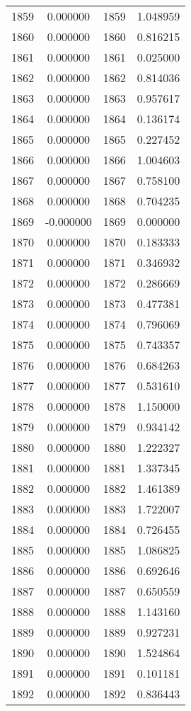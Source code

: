 \documentclass[12pt]{article}
\begin{document}
\begin{longtable}{@{}cccc@{}}
1859 & 0.000000 & 1859 & 1.048959 \\
1860 & 0.000000 & 1860 & 0.816215 \\
1861 & 0.000000 & 1861 & 0.025000 \\
1862 & 0.000000 & 1862 & 0.814036 \\
1863 & 0.000000 & 1863 & 0.957617 \\
1864 & 0.000000 & 1864 & 0.136174 \\
1865 & 0.000000 & 1865 & 0.227452 \\
1866 & 0.000000 & 1866 & 1.004603 \\
1867 & 0.000000 & 1867 & 0.758100 \\
1868 & 0.000000 & 1868 & 0.704235 \\
1869 & -0.000000 & 1869 & 0.000000 \\
1870 & 0.000000 & 1870 & 0.183333 \\
1871 & 0.000000 & 1871 & 0.346932 \\
1872 & 0.000000 & 1872 & 0.286669 \\
1873 & 0.000000 & 1873 & 0.477381 \\
1874 & 0.000000 & 1874 & 0.796069 \\
1875 & 0.000000 & 1875 & 0.743357 \\
1876 & 0.000000 & 1876 & 0.684263 \\
1877 & 0.000000 & 1877 & 0.531610 \\
1878 & 0.000000 & 1878 & 1.150000 \\
1879 & 0.000000 & 1879 & 0.934142 \\
1880 & 0.000000 & 1880 & 1.222327 \\
1881 & 0.000000 & 1881 & 1.337345 \\
1882 & 0.000000 & 1882 & 1.461389 \\
1883 & 0.000000 & 1883 & 1.722007 \\
1884 & 0.000000 & 1884 & 0.726455 \\
1885 & 0.000000 & 1885 & 1.086825 \\
1886 & 0.000000 & 1886 & 0.692646 \\
1887 & 0.000000 & 1887 & 0.650559 \\
1888 & 0.000000 & 1888 & 1.143160 \\
1889 & 0.000000 & 1889 & 0.927231 \\
1890 & 0.000000 & 1890 & 1.524864 \\
1891 & 0.000000 & 1891 & 0.101181 \\
1892 & 0.000000 & 1892 & 0.836443 \\

\end{longtable}
\end{document}

